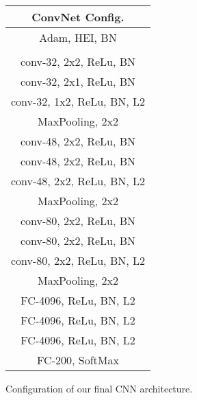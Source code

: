\begin{tabular}{|c|}
  \hline
  \multicolumn{1}{|c|}{ConvNet Config.}
  \\\hline
  Adam, HEI, BN
  \\\hhline{|=|}

  \multicolumn{1}{|c|}{input ($64\times64\times3\;RGB\;image$)}
  \\\hline

  conv-32, 2x2, ReLu, BN
  \\
  conv-32, 2x1, ReLu, BN
  \\
  conv-32, 1x2, ReLu, BN, L2
  \\\hline
  MaxPooling, 2x2
  \\\hline
  conv-48, 2x2, ReLu, BN
  \\
  conv-48, 2x2, ReLu, BN
  \\
  conv-48, 2x2, ReLu, BN, L2
  \\\hline
  MaxPooling, 2x2
  \\\hline
  conv-80, 2x2, ReLu, BN
  \\
  conv-80, 2x2, ReLu, BN
  \\
  conv-80, 2x2, ReLu, BN, L2
  \\\hline
  MaxPooling, 2x2
  \\\hline
  FC-4096, ReLu, BN, L2
  \\\hline
  FC-4096, ReLu, BN, L2
  \\\hline
  FC-4096, ReLu, BN, L2
  \\\hline
  FC-200, SoftMax
  \\\hline
  \end{tabular}
\caption[]
{\small
  Configuration of our final CNN architecture.
}
\label{table:final_config}
